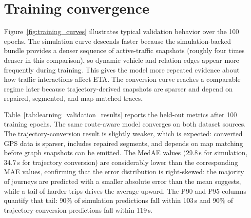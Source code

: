 \section{Training convergence}
Figure~\ref{fig:training_curves} illustrates typical validation behavior over the 100 epochs. The simulation curve descends faster because the simulation-backed bundle provides a denser sequence of active-traffic snapshots (roughly four times denser in this comparison), so dynamic vehicle and relation edges appear more frequently during training. This gives the model more repeated evidence about how traffic interactions affect ETA. The conversion curve reaches a comparable regime later because trajectory-derived snapshots are sparser and depend on repaired, segmented, and map-matched traces.



Table~\ref{tab:learning_validation_results} reports the held-out metrics after 100 training epochs. The same route-aware model converges on both dataset sources. The trajectory-conversion result is slightly weaker, which is expected: converted GPS data is sparser, includes repaired segments, and depends on map matching before graph snapshots can be emitted. The MedAE values (29.8\,s for simulation, 34.7\,s for trajectory conversion) are considerably lower than the corresponding MAE values, confirming that the error distribution is right-skewed: the majority of journeys are predicted with a smaller absolute error than the mean suggests, while a tail of harder trips drives the average upward. The P90 and P95 columns quantify that tail: 90\% of simulation predictions fall within 103\,s and 90\% of trajectory-conversion predictions fall within 119\,s.

\begin{table}[!htbp]
\caption[Learning validation after 100 epochs: DSTRA vs.\ mean-duration baseline.]{Learning validation after 100 epochs: DSTRA vs.\ mean-duration baseline. MAE, RMSE, MedAE, P90, and P95 are in seconds; MAPE is in percent. MedAE is the median absolute error; P90/P95 are the 90th/95th percentile absolute errors.}
\label{tab:learning_validation_results}
\centering
\scriptsize
\setlength{\tabcolsep}{3pt}
\end{table}

